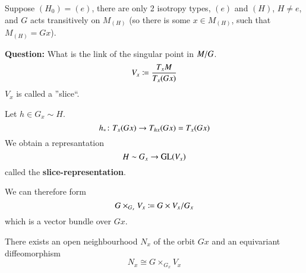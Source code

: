 
Suppose $(H_0) = (e)$, there are only 2 isotropy types, $(e)$ and $(H)$, $H \neq e$, and $G$ acts transitively on $M_{(H)}$ (so there is some $x\in M_{(H)}$, such that $M_{(H)} = Gx$).

\textbf{Question:} What is the link of the singular point in $M / G$.
\[ V_x \coloneqq \frac{T_xM}{T_x(Gx)} \]
$V_x$ is called a ”slice“.

Let $h \in G_x \sim H$.
\[ h_* \colon T_x(Gx) \to T_{hx}(Gx) = T_x(Gx) \]
We obtain a represantation
\[ H \sim G_x \to \text{GL}(V_x) \]
called the \textbf{slice-representation}.

We can therefore form
\[ G \times_{G_x} V_x \coloneqq G\times V_x / G_x \]
which is a vector bundle over $Gx$.

\begin{satz}
    There exists an open neighbourhood $N_x$ of the orbit $Gx$ and an equivariant diffeomorphism
    \[ N_x \cong G \times_{G_x} V_x \]
\end{satz}


